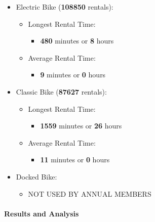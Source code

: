 \documentclass[
]{article}
\providecommand{\tightlist}{%
  \setlength{\itemsep}{0pt}\setlength{\parskip}{0pt}}
\begin{document}
\begin{itemize}
\tightlist
\item
  Electric Bike (\textbf{108850} rentals):

  \begin{itemize}
  \tightlist
  \item
    Longest Rental Time:

    \begin{itemize}
    \tightlist
    \item
      \textbf{480} minutes or \textbf{8} hours
    \end{itemize}
  \item
    Average Rental Time:

    \begin{itemize}
    \tightlist
    \item
      \textbf{9} minutes or \textbf{0} hours
    \end{itemize}
  \end{itemize}
\item
  Classic Bike (\textbf{87627} rentals):

  \begin{itemize}
  \tightlist
  \item
    Longest Rental Time:

    \begin{itemize}
    \tightlist
    \item
      \textbf{1559} minutes or \textbf{26} hours
    \end{itemize}
  \item
    Average Rental Time:

    \begin{itemize}
    \tightlist
    \item
      \textbf{11} minutes or \textbf{0} hours
    \end{itemize}
  \end{itemize}
\item
  Docked Bike:

  \begin{itemize}
  \tightlist
  \item
    NOT USED BY ANNUAL MEMBERS
  \end{itemize}
\end{itemize}

\hypertarget{results-and-analysis}{%
\paragraph{Results and Analysis}\label{results-and-analysis}}
\end{document}
